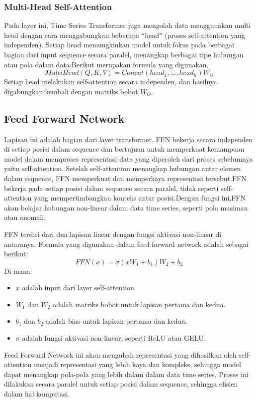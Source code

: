 \subsubsection{Multi-Head Self-Attention}
Pada layer ini, Time Series Transformer juga mengolah data menggunakan multi head dengan cara menggabungkan beberapa “head” (proses self-attention yang independen). Setiap head memungkinkan model untuk fokus pada berbagai bagian dari input sequence secara paralel, menangkap berbagai tipe hubungan atau pola dalam data.Berikut merupakan formula yang digunakan.
    \begin{equation}
      MultiHead(Q,K,V)=Concat(head_{1}, ...,head_{h})W_{O}
    \end{equation}
Setiap head melakukan self-attention secara independen, dan hasilnya digabungkan kembali dengan matriks bobot \( W_O \).

\subsection{Feed Forward Network}
Lapisan ini adalah bagian dari layer transformer. FFN bekerja secara independen di setiap posisi dalam sequence dan bertujuan untuk memperkuat kemampuan model dalam memproses representasi data yang diperoleh dari proses sebelumnya yaitu self-attention. Setelah self-attention menangkap hubungan antar elemen dalam sequence, FFN memperkuat dan memperkaya representasi tersebut.FFN bekerja pada setiap posisi dalam sequence secara paralel, tidak seperti self-attention yang mempertimbangkan konteks antar posisi.Dengan fungsi ini,FFN akan belajar hubungan non-linear dalam data time series, seperti pola musiman atau anomali.

FFN terdiri dari dua lapisan linear dengan fungsi aktivasi non-linear di antaranya. Formula yang digunakan dalam feed forward network adalah sebagai berikut:
\begin{equation}
  FFN(x) = \sigma(xW_1 + b_1)W_2 + b_2
\end{equation}
Di mana:
\begin{itemize}
    \item \( x \) adalah input dari layer self-attention.
    \item \( W_1 \) dan \( W_2 \) adalah matriks bobot untuk lapisan pertama dan kedua.
    \item \( b_1 \) dan \( b_2 \) adalah bias untuk lapisan pertama dan kedua.
    \item \( \sigma \) adalah fungsi aktivasi non-linear, seperti ReLU atau GELU.
\end{itemize}
Feed Forward Network ini akan mengubah representasi yang dihasilkan oleh self-attention menjadi representasi yang lebih kaya dan kompleks, sehingga model dapat menangkap pola-pola yang lebih dalam dalam data time series. Proses ini dilakukan secara paralel untuk setiap posisi dalam sequence, sehingga efisien dalam hal komputasi.

